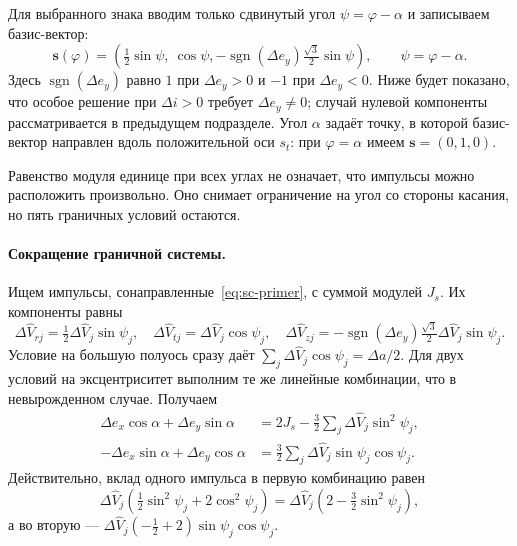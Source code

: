 Для выбранного знака вводим только сдвинутый угол
$\psi=\varphi-\alpha$ и записываем базис-вектор:
\begin{equation}
 \boxed{\boldsymbol s(\varphi)=
 \left(\tfrac12\sin\psi,\ \cos\psi,
       -\operatorname{sgn}(\Delta e_y)\tfrac{\sqrt3}{2}\sin\psi\right),
 \qquad\psi=\varphi-\alpha.}
 \label{eq:sc-primer}
\end{equation}
Здесь $\operatorname{sgn}(\Delta e_y)$ равно $1$ при
$\Delta e_y>0$ и $-1$ при $\Delta e_y<0$.
Ниже будет показано, что особое решение при $\Delta i>0$
требует $\Delta e_y\ne0$; случай нулевой компоненты
рассматривается в предыдущем подразделе.
Угол $\alpha$ задаёт точку, в которой базис-вектор направлен
вдоль положительной оси $s_t$: при $\varphi=\alpha$ имеем
$\boldsymbol s=(0,1,0)$.

Равенство модуля единице при всех углах не означает, что
импульсы можно расположить произвольно. Оно снимает ограничение
на угол со стороны касания, но пять граничных условий остаются.



\paragraph{Сокращение граничной системы.}
Ищем импульсы, сонаправленные~\eqref{eq:sc-primer}, с суммой
модулей $J_s$. Их компоненты равны
\[
 \Delta\widehat V_{rj}=\tfrac12\Delta\widehat V_j\sin\psi_j,
 \quad \Delta\widehat V_{tj}=\Delta\widehat V_j\cos\psi_j,
 \quad \Delta\widehat V_{zj}=
 -\operatorname{sgn}(\Delta e_y)\tfrac{\sqrt3}{2}
                       \Delta\widehat V_j\sin\psi_j.
\]
Условие на большую полуось сразу даёт
$\sum_j\Delta\widehat V_j\cos\psi_j=\Delta a/2$.
Для двух условий на эксцентриситет выполним те же линейные
комбинации, что в невырожденном случае. Получаем
\begin{equation}
\begin{aligned}
 \Delta e_x\cos\alpha+\Delta e_y\sin\alpha
 &=2J_s-\frac32\sum_j\Delta\widehat V_j\sin^2\psi_j,\\
 -\Delta e_x\sin\alpha+\Delta e_y\cos\alpha
 &=\frac32\sum_j\Delta\widehat V_j\sin\psi_j\cos\psi_j.
\end{aligned}
\label{eq:sc-rotated-eccentricity}
\end{equation}
Действительно, вклад одного импульса в первую комбинацию равен
\[
 \Delta\widehat V_j
       \left(\tfrac12\sin^2\psi_j+2\cos^2\psi_j\right)
 =\Delta\widehat V_j\left(2-\tfrac32\sin^2\psi_j\right),
\]
а во вторую ---
$\Delta\widehat V_j(-\tfrac12+2)\sin\psi_j\cos\psi_j$.

